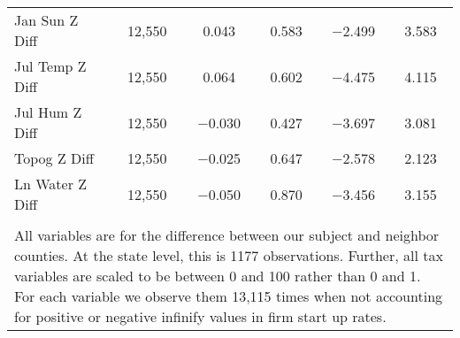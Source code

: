 \begin{table}[!htbp]
\begin{tabular}{@{\extracolsep{5pt}}lccccc}
Jan Sun Z Diff & 12,550 & 0.043 & 0.583 & $-$2.499 & 3.583 \\ 
Jul Temp Z Diff & 12,550 & 0.064 & 0.602 & $-$4.475 & 4.115 \\ 
Jul Hum Z Diff & 12,550 & $-$0.030 & 0.427 & $-$3.697 & 3.081 \\ 
Topog Z Diff & 12,550 & $-$0.025 & 0.647 & $-$2.578 & 2.123 \\ 
Ln Water Z Diff & 12,550 & $-$0.050 & 0.870 & $-$3.456 & 3.155 \\ 
\hline \\[-1.8ex] 
\multicolumn{6}{l}{All variables are for the difference between our subject and neighbor counties. At the state level, this is 1177 observations. Further, all tax variables are scaled to be between 0 and 100 rather than 0 and 1. For each variable we observe them 13,115 times when not accounting for positive or negative infinify values in firm start up rates.} \\ 
\end{tabular} 
\end{table} 
